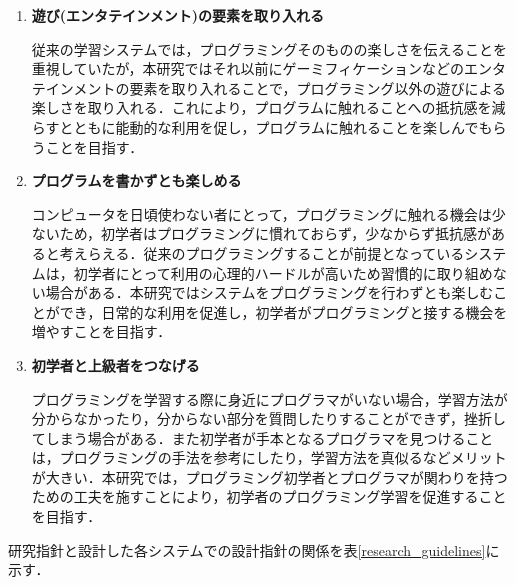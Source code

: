 \begin{enumerate}
  \item {\bf 遊び(エンタテインメント)の要素を取り入れる}
  
  従来の学習システムでは，プログラミングそのものの楽しさを伝えることを重視していたが，本研究ではそれ以前にゲーミフィケーションなどのエンタテインメントの要素を取り入れることで，プログラミング以外の遊びによる楽しさを取り入れる．これにより，プログラムに触れることへの抵抗感を減らすとともに能動的な利用を促し，プログラムに触れることを楽しんでもらうことを目指す．


  \item {\bf プログラムを書かずとも楽しめる}


  コンピュータを日頃使わない者にとって，プログラミングに触れる機会は少ないため，初学者はプログラミングに慣れておらず，少なからず抵抗感があると考えらえる．従来のプログラミングすることが前提となっているシステムは，初学者にとって利用の心理的ハードルが高いため習慣的に取り組めない場合がある．本研究ではシステムをプログラミングを行わずとも楽しむことができ，日常的な利用を促進し，初学者がプログラミングと接する機会を増やすことを目指す．

  \item {\bf 初学者と上級者をつなげる}


  プログラミングを学習する際に身近にプログラマがいない場合，学習方法が分からなかったり，分からない部分を質問したりすることができず，挫折してしまう場合がある．また初学者が手本となるプログラマを見つけることは，プログラミングの手法を参考にしたり，学習方法を真似るなどメリットが大きい．本研究では，プログラミング初学者とプログラマが関わりを持つための工夫を施すことにより，初学者のプログラミング学習を促進することを目指す．

\end{enumerate}

研究指針と設計した各システムでの設計指針の関係を表\ref{research_guidelines}に示す．

